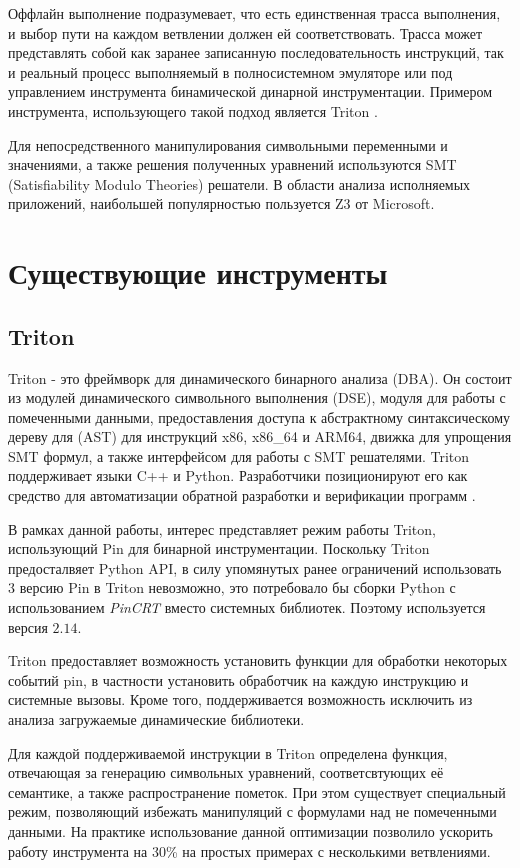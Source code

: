 Оффлайн выполнение подразумевает, что есть единственная трасса выполнения, и выбор пути на каждом ветвлении должен ей соответствовать. Трасса может представлять собой как заранее записанную последовательность инструкций, так и реальный процесс выполняемый в полносистемном эмуляторе или под управлением инструмента бинамической динарной инструментации.
Примером инструмента, использующего такой подход является Triton \cite{Triton}.

Для непосредственного манипулирования символьными переменными и значениями, а также решения полученных уравнений используются SMT (Satisfiability Modulo Theories) решатели. В области анализа исполняемых приложений, наибольшей популярностью пользуется Z3 \cite{Z3} от Microsoft.



\section{Существующие инструменты}


\subsection{Triton}

Triton - это фреймворк для динамического бинарного анализа (DBA). Он состоит из модулей динамического символьного выполнения (DSE), модуля для работы с помеченными данными, предоставления доступа к абстрактному синтаксическому дереву для (AST) для инструкций x86, x86_64 и ARM64, движка для упрощения SMT формул, а также интерфейсом для работы с SMT решателями. Triton поддерживает языки C++ и Python.
Разработчики позиционируют его как средство для автоматизации обратной разработки и верификации программ \cite{Triton}.

В рамках данной работы, интерес представляет режим работы Triton, использующий Pin для бинарной инструментации. Поскольку Triton предосталвяет Python API, в силу упомянутых ранее ограничений  использовать $3$ версию Pin в Triton невозможно, это потребовало бы сборки Python с использованием \emph{PinCRT} вместо системных библиотек. Поэтому используется версия $2.14$.

Triton предоставляет возможность установить функции для обработки некоторых событий pin, в частности установить обработчик на каждую инструкцию и системные вызовы. Кроме того, поддерживается возможность исключить из анализа загружаемые динамические библиотеки.

Для каждой поддерживаемой инструкции в Triton определена функция, отвечающая за генерацию символьных уравнений, соответсвтующих её семантике, а также распространение пометок. При этом существует специальный режим, позволяющий избежать манипуляций с формулами над не помеченными данными. На практике использование данной оптимизации позволило ускорить работу инструмента на 30\% на простых примерах с несколькими ветвлениями.

